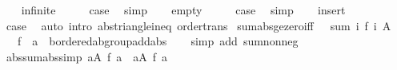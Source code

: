 \begin{isabellebody}
\ \ \isamarkupfalse%
\ infinite\isanewline
\ \ \isamarkupfalse%
\ \isamarkupfalse%
\ {\isacharquery}{\kern0pt}case\ \isamarkupfalse%
\ simp\isanewline
{}\isamarkupfalse%
\isanewline
\ \ \isamarkupfalse%
\ empty\isanewline
\ \ \isamarkupfalse%
\ \isamarkupfalse%
\ {\isacharquery}{\kern0pt}case\ \isamarkupfalse%
\ simp\isanewline
{}\isamarkupfalse%
\isanewline
\ \ \isamarkupfalse%
\ insert\isanewline
\ \ \isamarkupfalse%
\ \isamarkupfalse%
\ {\isacharquery}{\kern0pt}case\ \isamarkupfalse%
\ {\isacharparenleft}{\kern0pt}auto\ intro{\isacharcolon}{\kern0pt}\ abs{\isacharunderscore}{\kern0pt}triangle{\isacharunderscore}{\kern0pt}ineq\ order{\isacharunderscore}{\kern0pt}trans{\isacharparenright}{\kern0pt}\isanewline
{}\isamarkupfalse%
%
\endisatagproof
{\isafoldproof}%
%
\isadelimproof
\isanewline
%
\endisadelimproof
\isanewline
{}\isamarkupfalse%
\ sum{\isacharunderscore}{\kern0pt}abs{\isacharunderscore}{\kern0pt}ge{\isacharunderscore}{\kern0pt}zero{\isacharbrackleft}{\kern0pt}iff{\isacharbrackright}{\kern0pt}{\isacharcolon}{\kern0pt}\ {\isachardoublequoteopen}{}\ {\isasymle}\ sum\ {\isacharparenleft}{\kern0pt}{\isasymlambda}i{\isachardot}{\kern0pt}\ {\isasymbar}f\ i{\isasymbar}{\isacharparenright}{\kern0pt}\ A{\isachardoublequoteclose}\isanewline
\ \ \ f\ {\isacharcolon}{\kern0pt}{\isacharcolon}{\kern0pt}\ {\isachardoublequoteopen}{\isacharprime}{\kern0pt}a\ {\isasymRightarrow}\ {\isacharprime}{\kern0pt}b{\isacharcolon}{\kern0pt}{\isacharcolon}{\kern0pt}ordered{\isacharunderscore}{\kern0pt}ab{\isacharunderscore}{\kern0pt}group{\isacharunderscore}{\kern0pt}add{\isacharunderscore}{\kern0pt}abs{\isachardoublequoteclose}\isanewline
%
\isadelimproof
\ \ %
\endisadelimproof
%
\isatagproof
{}\isamarkupfalse%
\ {\isacharparenleft}{\kern0pt}simp\ add{\isacharcolon}{\kern0pt}\ sum{\isacharunderscore}{\kern0pt}nonneg{\isacharparenright}{\kern0pt}%
\endisatagproof
{\isafoldproof}%
%
\isadelimproof
\isanewline
%
\endisadelimproof
\isanewline
{}\isamarkupfalse%
\ abs{\isacharunderscore}{\kern0pt}sum{\isacharunderscore}{\kern0pt}abs{\isacharbrackleft}{\kern0pt}simp{\isacharbrackright}{\kern0pt}{\isacharcolon}{\kern0pt}\ {\isachardoublequoteopen}{\isasymbar}{\isasymSum}a{\isasymin}A{\isachardot}{\kern0pt}\ {\isasymbar}f\ a{\isasymbar}{\isasymbar}\ {\isacharequal}{\kern0pt}\ {\isacharparenleft}{\kern0pt}{\isasymSum}a{\isasymin}A{\isachardot}{\kern0pt}\ {\isasymbar}f\ a{\isasymbar}{\isacharparenright}{\kern0pt}{\isachardoublequoteclose}\isanewline

\end{isabellebody}
